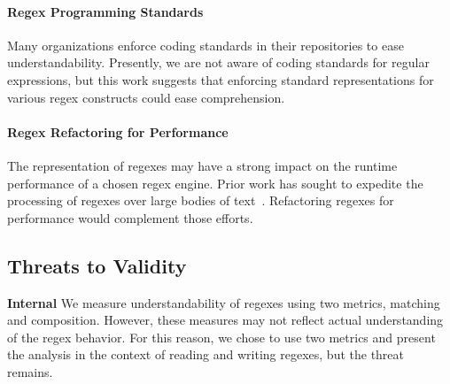 %

\paragraph{Regex Programming Standards}
Many organizations enforce coding standards in their repositories to ease understandability.
Presently, we are not aware of coding standards for regular expressions, but this work suggests that enforcing standard representations for various regex constructs could ease comprehension.  

\paragraph{Regex Refactoring for Performance}
The representation of regexes may have a strong impact on the runtime performance of a chosen regex engine. Prior work has sought to expedite the processing of regexes over large bodies of text~\cite{Baeza-Yates:1996:FTS:235809.235810}. 
Refactoring regexes for performance would complement those efforts. 

\subsection{Threats to Validity}

\textbf{Internal}
We measure understandability of regexes using two metrics, matching and composition. However, these measures may not reflect actual understanding of the regex behavior. For this reason, we chose to use two metrics and present the analysis in the context of reading and writing regexes, but the threat remains.


